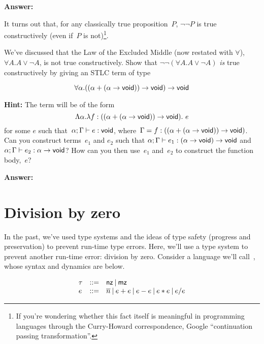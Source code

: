 \documentclass{article}
\begin{document}
\textbf{Answer:}

It turns out that, for any classically true proposition~$P$, $\lnot \lnot P$
is true constructively (even if~$P$ is not)\footnote{If you're wondering
  whether this fact itself is meaningful in programming languages through
  the Curry-Howard correspondence, Google ``continuation passing transformation''.}.

\begin{task}
  We've discussed that the Law of the Excluded Middle (now restated with
  $\forall$),
  $\forall A. A \lor \lnot A$, is
  not true constructively. Show that
  $\lnot \lnot (\forall A. A \lor \lnot A)$ \textit{is} true constructively by
  giving an STLC term of type
  
  \[\forall \alpha. ((\alpha + (\alpha \rightarrow \mathsf{void})) \rightarrow \mathsf{void}) \rightarrow \mathsf{void}\]

  \textbf{Hint: }
    The term will be of the form
    \[\Lambda \alpha. \lambda f : ((\alpha + (\alpha \rightarrow \mathsf{void})) \rightarrow \mathsf{void}). ~e\]
    for some $e$ such that~$\alpha; \Gamma \vdash e : \mathsf{void}$,
    where~$\Gamma = f:((\alpha + (\alpha \rightarrow \mathsf{void})) \rightarrow \mathsf{void})$.
    Can you construct terms~$e_1$ and $e_2$ such that
    $\alpha; \Gamma \vdash e_1 : (\alpha \rightarrow \mathsf{void}) \rightarrow \mathsf{void}$
    and~$\alpha; \Gamma \vdash e_2 : \alpha \rightarrow \mathsf{void}$?
    How can you then use~$e_1$ and~$e_2$ to construct the function body,~$e$?
\end{task}

\textbf{Answer:}

\section{Division by zero}

In the past, we've used type systems and the ideas of type safety (progress
and preservation) to prevent run-time type errors.
%
Here, we'll use a type system to prevent another run-time error: division by
zero.
%
Consider a language we'll call~\ezlang{}, whose syntax and dynamics are below.

{
  \centering
  \[
  \begin{array}{l l l}
    \tau & \mathop{::=} & \mathsf{nz} \mathbin{|} \mathsf{mz}\\
    e & \mathop{::=} &
    \overline{n} \mathbin{|}
    e + e \mathbin{|}
    e - e \mathbin{|}
    e * e \mathbin{|}
    e / e
  \end{array}
  \]
}
\end{document}
